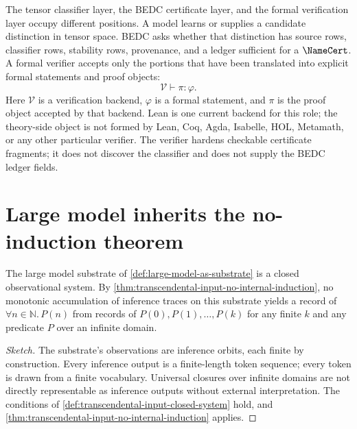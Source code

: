 \begin{principle}
\label{prin:large-model-formal-verification-layer}
The tensor classifier layer, the BEDC certificate layer, and the formal
verification layer occupy different positions. A model learns or supplies
a candidate distinction in tensor space. BEDC asks whether that
distinction has source rows, classifier rows, stability rows, provenance,
and a ledger sufficient for a $\NameCert$. A formal verifier accepts only
the portions that have been translated into explicit formal statements
and proof objects:
$$
\mathcal{V}\vdash \pi:\varphi.
$$
Here $\mathcal{V}$ is a verification backend, $\varphi$ is a formal
statement, and $\pi$ is the proof object accepted by that backend. Lean is
one current backend for this role; the theory-side object is not formed
by Lean, Coq, Agda, Isabelle, HOL, Metamath, or any other particular
verifier. The verifier hardens checkable certificate fragments; it does
not discover the classifier and does not supply the BEDC ledger fields.
\end{principle}

\section{Large model inherits the no-induction theorem}
\label{sec:large-model-inherits-no-induction}

\begin{theorem}
\label{thm:large-model-no-internal-induction}
The large model substrate of \autoref{def:large-model-as-substrate} is a closed observational system. By \autoref{thm:transcendental-input-no-internal-induction}, no monotonic accumulation of inference traces on this substrate yields a record of $\forall n \in \mathbb{N}.\, P(n)$ from records of $P(0), P(1), \ldots, P(k)$ for any finite $k$ and any predicate $P$ over an infinite domain.
\end{theorem}

\begin{proof}[Sketch]
The substrate's observations are inference orbits, each finite by construction. Every inference output is a finite-length token sequence; every token is drawn from a finite vocabulary. Universal closures over infinite domains are not directly representable as inference outputs without external interpretation. The conditions of \autoref{def:transcendental-input-closed-system} hold, and \autoref{thm:transcendental-input-no-internal-induction} applies.
\end{proof}


